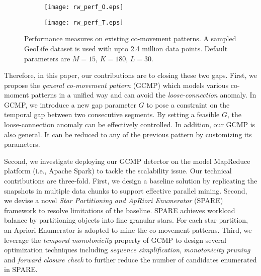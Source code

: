 \begin{figure}[h]
	\vspace{-3mm}
    \centering
    \begin{subfigure}[b]{0.23\textwidth}
            \centering
            \texttt{[image: rw\_perf\_O.eps]}
            \vspace{-1.5em}
    \label{fig:fig1}
    \end{subfigure}
    \begin{subfigure}[b]{0.23\textwidth}
            \centering
            \texttt{[image: rw\_perf\_T.eps]}
            \vspace{-1.5em}
    \label{fig:fig2}
    \end{subfigure}
   \vspace{-0.5em}
    \caption{Performance measures on existing co-movement patterns. A sampled GeoLife dataset
    is used with upto 2.4 million data points. Default parameters are $M=15$, $K=180$, $L=30$.}
    \label{fig:related_work_scalability}
    \vspace{-0.5em}
\end{figure}

Therefore, in this paper, our contributions are to closing these two gaps.
First, we propose the \emph{general co-movement pattern} (GCMP) which models
various co-moment patterns in a unified way and can avoid 
the \emph{loose-connection} anomaly. In GCMP, we introduce a new gap parameter $G$ to pose a constraint on the temporal gap between two consecutive segments. 
By setting a feasible $G$, the loose-connection anomaly can be effectively controlled. In addition, our GCMP is also general. %
It can be reduced to any of the previous pattern by customizing its parameters.

Second, we investigate deploying our GCMP detector on the model MapReduce platform (i.e., Apache Spark) to tackle the scalability issue. Our technical contributions are three-fold. First, we design a baseline solution by replicating the snapshots in multiple data chunks to support effective parallel mining. Second, we devise a novel \emph{Star Partitioning and ApRiori Enumerator} (SPARE) framework to resolve limitations of the baseline. SPARE achieves workload balance by partitioning objects into fine granular stars.  For each star partition, an Apriori Enumerator is adopted to mine the co-movement patterns. Third, we leverage the \emph{temporal monotonicity} property of GCMP 
to design several optimization techniques including \emph{sequence simplification}, \emph{monotonicity pruning} and \emph{forward closure check} to further reduce the number of candidates enumerated in SPARE.

